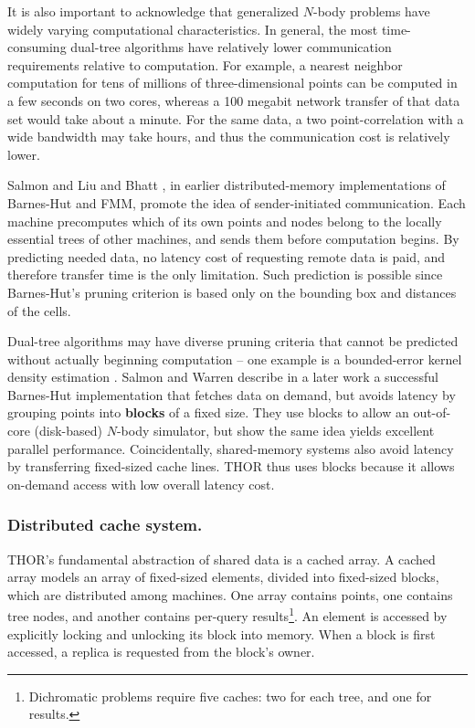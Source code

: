 \documentclass[twoside,leqno,twocolumn]{article}
\newcommand{\mysubsub}[1]{\subsubsection{#1.}}
\newcommand{\defterm}[1]{{\bf #1}}
\begin{document}
It is also important to acknowledge that generalized $N$-body problems have widely varying computational characteristics.
In general, the most time-consuming dual-tree algorithms have relatively lower communication requirements relative to computation.
For example, a nearest neighbor computation for tens of millions of three-dimensional points can be computed in a few seconds on two cores, whereas a 100 megabit network transfer of that data set would take about a minute.
For the same data, a two point-correlation with a wide bandwidth may take hours, and thus the communication cost is relatively lower.

Salmon \cite{salmon_thesis} and Liu and Bhatt \cite{liu94experiences}, in earlier distributed-memory implementations of Barnes-Hut and FMM, promote the idea of sender-initiated communication.
Each machine precomputes which of its own points and nodes belong to the locally essential trees of other machines, and sends them before computation begins.
By predicting needed data, no latency cost of requesting remote data is paid, and therefore transfer time is the only limitation.
Such prediction is possible since Barnes-Hut's pruning criterion is based only on the bounding box and distances of the cells.

Dual-tree algorithms may have diverse pruning criteria that cannot be predicted without actually beginning computation -- one example is a bounded-error kernel density estimation \cite{gray_kde}.
Salmon and Warren describe in a later work \cite{salmon97parallel} a successful Barnes-Hut implementation that fetches data on demand, but avoids latency by grouping points into \defterm{blocks} of a fixed size.
They use blocks to allow an out-of-core (disk-based) $N$-body simulator, but show the same idea yields excellent parallel performance.
Coincidentally, shared-memory systems also avoid latency by transferring fixed-sized cache lines.
THOR thus uses blocks because it allows on-demand access with low overall latency cost.

\mysubsub{Distributed cache system}

THOR's fundamental abstraction of shared data is a cached array.
A cached array models an array of fixed-sized elements, divided into fixed-sized blocks, which are distributed among machines.
One array contains points, one contains tree nodes, and another contains per-query results\footnote{Dichromatic problems require five caches: two for each tree, and one for results.}.
An element is accessed by explicitly locking and unlocking its block into memory.
When a block is first accessed, a replica is requested from the block's owner.
\end{document}
